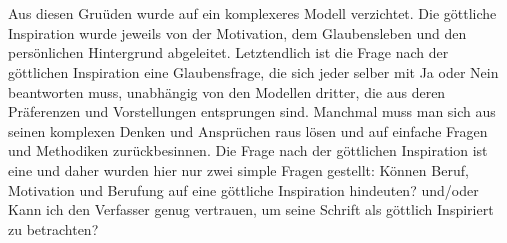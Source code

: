 \\~\\
Aus diesen Gruüden wurde auf ein komplexeres Modell verzichtet. Die göttliche Inspiration wurde jeweils von der Motivation, dem Glaubensleben und den persönlichen Hintergrund abgeleitet. Letztendlich ist die Frage nach der göttlichen Inspiration eine Glaubensfrage, die sich jeder selber mit Ja oder Nein beantworten muss, unabhängig von den Modellen dritter, die aus deren Präferenzen und Vorstellungen entsprungen sind. Manchmal muss man sich aus seinen komplexen Denken und Ansprüchen raus lösen und auf einfache Fragen und Methodiken zurückbesinnen. Die Frage nach der göttlichen Inspiration ist eine und daher wurden hier nur zwei simple Fragen gestellt: Können Beruf, Motivation und Berufung auf eine göttliche Inspiration hindeuten? und/oder Kann ich den Verfasser genug vertrauen, um seine Schrift als göttlich Inspiriert zu betrachten?

